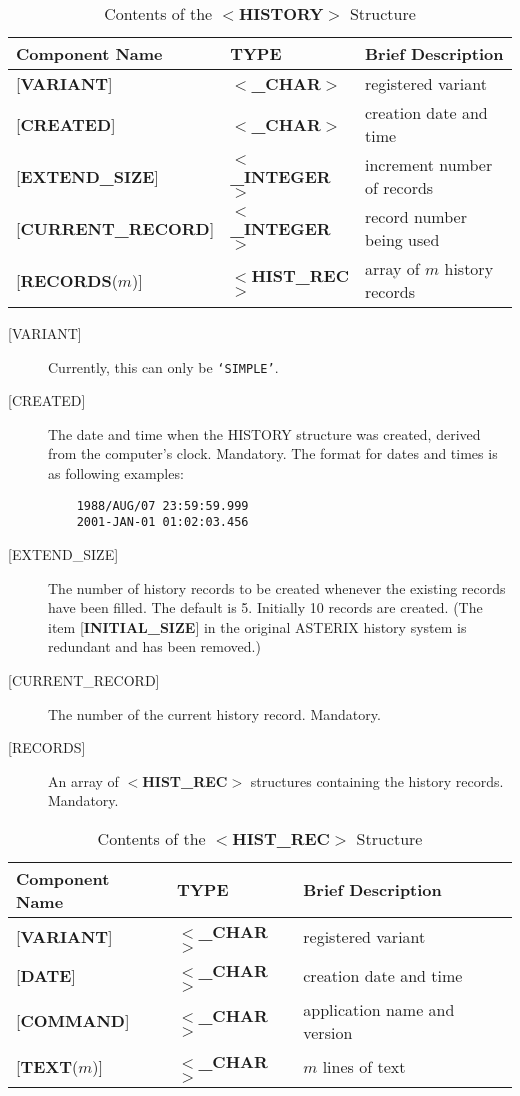 \begin{table}[htb]
\centering
\caption{Contents of the $<${\bf HISTORY}$>$ Structure}
\label{ta:history}
\begin{tabular}{|l|l|l|}
\hline
Component Name & TYPE & Brief Description \\ \hline
{[}{\bf VARIANT}{]} & $<${\bf \_CHAR}$>$ & registered variant \\
{[}{\bf CREATED}{]} & $<${\bf \_CHAR}$>$ & creation date and time \\
{[}{\bf EXTEND\_SIZE}{]} & $<${\bf \_INTEGER}$>$ & increment number of records \\
{[}{\bf CURRENT\_RECORD}{]} & $<${\bf \_INTEGER}$>$ & record number being used \\
{[}{\bf RECORDS}($m$){]} & $<${\bf HIST\_REC}$>$ & array of $m$ history records \\ \hline
\end{tabular}
\end{table}

\begin{description}
\item [{[}VARIANT{]}]
Currently, this can only be {\tt `SIMPLE'}.
\item [{[}CREATED{]}]
The date and time when the HISTORY structure was created,
derived from the computer's clock.  Mandatory.  The format for
dates and times is as following examples:
\begin{verbatim}
    1988/AUG/07 23:59:59.999
    2001-JAN-01 01:02:03.456
\end{verbatim}
\item [{[}EXTEND\_SIZE{]}]
The number of history records to be created whenever the existing
records have been filled.  The default is 5.
Initially 10 records are created.  (The item
{[}{\bf INITIAL\_SIZE}{]}
in the original ASTERIX history system is redundant and has been
removed.)
\item [{[}CURRENT\_RECORD{]}]
The number of the current history record.  Mandatory.
\item [{[}RECORDS{]}]  An array of $<${\bf HIST\_REC}$>$
structures containing the
history records.  Mandatory.
\end{description}

\begin{table}[htb]
\centering
\caption{Contents of the $<${\bf HIST\_REC}$>$ Structure}
\begin{tabular}{|l|l|l|}
\hline
Component Name & TYPE & Brief Description \\ \hline
{[}{\bf VARIANT}{]} & $<${\bf \_CHAR}$>$ & registered variant \\
{[}{\bf DATE}{]} & $<${\bf \_CHAR}$>$ & creation date and time \\
{[}{\bf COMMAND}{]} & $<${\bf \_CHAR}$>$ & application name
      and version \\
{[}{\bf TEXT}($m$){]} & $<${\bf \_CHAR}$>$ &
      $m$ lines of text \\ \hline
\end{tabular}
\end{table}

